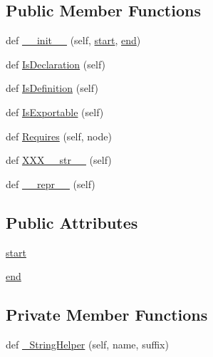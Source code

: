 \subsection*{Public Member Functions}
\begin{DoxyCompactItemize}
\item 
def \hyperlink{classcpp_1_1ast_1_1Node_a2cbd6969346645259afc3be51faae904}{\+\_\+\+\_\+init\+\_\+\+\_\+} (self, \hyperlink{classcpp_1_1ast_1_1Node_a7b2aa97e6a049bb1a93aea48c48f1f44}{start}, \hyperlink{classcpp_1_1ast_1_1Node_a3c5e5246ccf619df28eca02e29d69647}{end})
\item 
def \hyperlink{classcpp_1_1ast_1_1Node_ab3eca703a79fb65bc25dfbcb7547c79e}{Is\+Declaration} (self)
\item 
def \hyperlink{classcpp_1_1ast_1_1Node_a684ee9a357168e7e07a24fc6812f66e6}{Is\+Definition} (self)
\item 
def \hyperlink{classcpp_1_1ast_1_1Node_a313273874ccf578485006d4000128234}{Is\+Exportable} (self)
\item 
def \hyperlink{classcpp_1_1ast_1_1Node_a31ae211f954a8c578ef16226df5ac8c8}{Requires} (self, node)
\item 
def \hyperlink{classcpp_1_1ast_1_1Node_ab5dfeabcbcd7c1f5feb8522edffb8b4a}{X\+X\+X\+\_\+\+\_\+str\+\_\+\+\_\+} (self)
\item 
def \hyperlink{classcpp_1_1ast_1_1Node_ab89915656a60c7b7c752e5baa607c532}{\+\_\+\+\_\+repr\+\_\+\+\_\+} (self)
\end{DoxyCompactItemize}
\subsection*{Public Attributes}
\begin{DoxyCompactItemize}
\item 
\hyperlink{classcpp_1_1ast_1_1Node_a7b2aa97e6a049bb1a93aea48c48f1f44}{start}
\item 
\hyperlink{classcpp_1_1ast_1_1Node_a3c5e5246ccf619df28eca02e29d69647}{end}
\end{DoxyCompactItemize}
\subsection*{Private Member Functions}
\begin{DoxyCompactItemize}
\item 
def \hyperlink{classcpp_1_1ast_1_1Node_acb9507fa368fa5d6045a9eb9a0a8c3d3}{\+\_\+\+String\+Helper} (self, name, suffix)
\end{DoxyCompactItemize}


